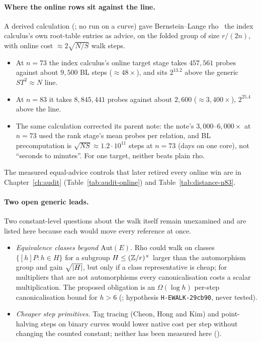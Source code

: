 \paragraph{Where the online rows sit against the line.} A derived
calculation (;
no run on a curve) gave Bernstein--Lange rho~\cite{bl2012} the index
calculus's own root-table entries as advice, on the folded group of size
$r/(2n)$, with online cost $\approx2\sqrt{N/S}$ walk steps.
\begin{itemize}
\item At $n=73$ the index calculus's online target stage takes $457{,}561$
  probes against about $9{,}500$ BL steps ($\approx48\times$), and sits
  $2^{13.2}$ above the generic $ST^2\approx N$ line.
\item At $n=83$ it takes $8{,}845{,}441$ probes against about $2{,}600$
  ($\approx3{,}400\times$), $2^{25.4}$ above the line.
\item The same calculation corrected its parent note: the note's
  $3{,}000$--$6{,}000\times$ at $n=73$ used the rank stage's mean probes per
  relation, and BL precomputation is $\sqrt{NS}\approx1.2\cdot10^{11}$ steps
  at $n=73$ (days on one core), not ``seconds to minutes''. For one target,
  neither beats plain rho.
\end{itemize}
The measured equal-advice controls that later retired every online win are
in Chapter~\ref{ch:audit} (Table~\ref{tab:audit-online}) and
Table~\ref{tab:distance-n83}.

\paragraph{Two open generic leads.} Two constant-level questions about the
walk itself remain unexamined and are listed here because each would move
every reference at once.
\begin{itemize}
\item \emph{Equivalence classes beyond $\mathrm{Aut}(E)$.} Rho could walk on
  classes $\{[h]P:h\in H\}$ for a subgroup $H\le(\mathbb{Z}/r)^\times$ larger than
  the automorphism group and gain $\sqrt{\lvert H \rvert}$, but only if a class
  representative is cheap; for multipliers that are not automorphisms every
  canonicalisation costs a scalar multiplication. The proposed obligation is
  an $\Omega(\log h)$ per-step canonicalisation bound for $h>6$
  (;
  hypothesis \texttt{H-EWALK-29cb90}, never tested).
\item \emph{Cheaper step primitives.} Tag tracing (Cheon, Hong and Kim)
  and point-halving steps on binary curves would lower native cost per step
  without changing the counted constant; neither has been measured here
  ().
\end{itemize}

